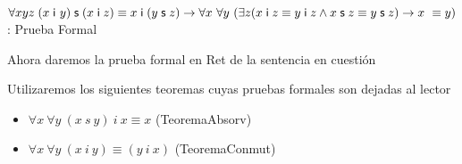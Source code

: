 \documentclass[10pt]{beamer}
\newcommand{\Cfonti}{\fontsize{8.5}{7.2}\selectfont}
\newcommand{\idistr}{\forall xyz\;(x\;\mathsf{i}\
y)\;\mathsf{s}\;(x\;\mathsf{i}\;z)\equiv x\;\mathsf{i}\;(y\;\mathsf{s}%
\;z)}
\newcommand{\myconj}{x\;\mathsf{i}\;z\equiv y\;\mathsf{%
i}\;z\wedge x\;\mathsf{s}\;z\equiv y\;\mathsf{s}\;z}
\begin{document}
\begin{frame}{\Cfonti$\idistr \rightarrow \forall x\ \forall y\ (\exists z (\myconj) \rightarrow x\ \equiv y)$:
   Prueba Formal}
  \begin{center}
    Ahora daremos la prueba formal en Ret de la sentencia en cuestión
    \pause
  \end{center}
  Utilizaremos los siguientes teoremas cuyas pruebas formales son dejadas al lector
  \begin{itemize}[<+->]
    \item $\forall x\ \forall y\ (x\ s\ y)\ i\ x \equiv x$  (TeoremaAbsorv)
    \item $\forall x\ \forall y\ (x\ i\ y) \equiv (y\ i\ x)$  (TeoremaConmut)
  \end{itemize}
\end{frame}
\end{document}
